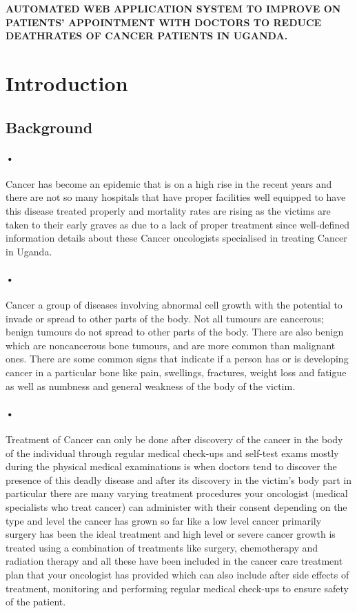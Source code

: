 \documentclass[12pt]{article}
\begin{document}
\newpage
\title{}\textbf{AUTOMATED WEB APPLICATION SYSTEM TO IMPROVE ON PATIENTS’ APPOINTMENT WITH DOCTORS TO REDUCE DEATHRATES OF CANCER PATIENTS IN UGANDA.
} 


\section{Introduction}
\subsection{Background}

\paragraph{•}Cancer has become an epidemic that is on a high rise in the recent years and there are not so many hospitals that have proper facilities well equipped to have this disease treated properly and mortality rates are rising as the victims are taken to their early graves as due to a lack of proper treatment since well-defined information details about these Cancer oncologists specialised in treating Cancer in Uganda.

\paragraph{•}Cancer a group of diseases involving abnormal cell growth with the potential to invade or spread to other parts of the body. Not all tumours are cancerous; benign tumours do not spread to other parts of the body. There are also benign which are noncancerous bone tumours, and are more common than malignant ones. There are some common signs that indicate if a person has or is developing cancer in a particular bone like pain, swellings, fractures, weight loss and fatigue as well as numbness and general weakness of the body of the victim. 

\paragraph{•}Treatment of Cancer can only be done after discovery of the cancer in the body of the individual through regular medical check-ups and self-test exams mostly during the physical medical examinations is when doctors tend to discover the presence of this deadly disease and after its discovery in the victim’s body part in particular there are many varying treatment procedures your oncologist (medical specialists who treat cancer) can administer with their consent  depending on the type and level the cancer has grown so far like a low level cancer primarily surgery has been the ideal treatment and high level or severe cancer growth is treated using a combination of treatments like surgery, chemotherapy and radiation therapy and all these have been included in the cancer care treatment plan that your oncologist has provided which can also include after side effects of treatment, monitoring and performing regular medical check-ups to ensure safety of the patient.
\end{document}
